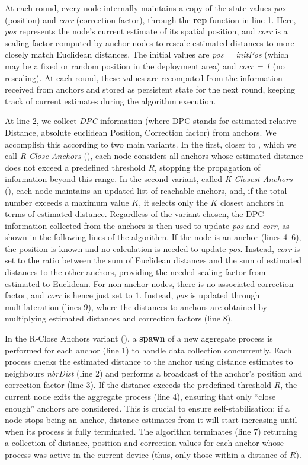 \documentclass[runningheads]{llncs}
\begin{document}
At each round, every node internally maintains a copy of the state values \emph{pos} (position) and \emph{corr} (correction factor), through  the \textbf{rep} function in line 1. Here, \emph{pos} represents the node's current estimate of its spatial position, and \emph{corr} is a scaling factor computed by anchor nodes to rescale estimated distances to more closely match Euclidean distances. The initial values are \emph{pos = initPos} (which may be a fixed or random position in the deployment area) and \emph{corr = 1} (no rescaling). At each round, these values are recomputed from the information received from anchors and stored as persistent state for the next round, keeping track of current estimates during the algorithm execution.

At line 2, we collect \emph{DPC} information (where DPC stands for estimated relative Distance, absolute euclidean Position, Correction factor) from anchors. We accomplish this according to two main variants. In the first, closer to \cite{DBLP:journals/telsys/NiculescuN03}, which we call \emph{R-Close Anchors} (), each node considers all anchors whose estimated distance does not exceed a predefined threshold $R$, stopping the propagation of information beyond this range. In the second variant, called \emph{K-Closest Anchors} (), each node maintains an updated list of reachable anchors, and, if the total number exceeds a maximum value $K$, it selects only the $K$ closest anchors in terms of estimated distance. Regardless of the variant chosen, the DPC information collected from the anchors is then used to update \emph{pos} and \emph{corr}, as shown in the following lines of the algorithm.
If the node is an anchor (lines 4–6), the position is known and no calculation is needed to update \emph{pos}. Instead, \emph{corr} is set to the ratio between the sum of Euclidean distances and the sum of estimated distances to the other anchors, providing the needed scaling factor from estimated to Euclidean. For non-anchor nodes, there is no associated correction factor, and  \emph{corr} is hence just set to $1$. Instead, \emph{pos} is updated through multilateration (lines 9), where the distances to anchors are obtained by multiplying estimated distances and correction factors (line 8).

In the R-Close Anchors variant (), a \textbf{spawn} of a new aggregate process is performed for each anchor (line 1) to handle data collection concurrently. Each process checks the estimated distance to the anchor using distance estimates to neighbours \emph{nbrDist} (line 2) and performs a broadcast of the anchor’s position and correction factor (line 3). If the distance exceeds the predefined threshold $R$, the current node exits the aggregate process (line 4), ensuring that only ``close enough'' anchors are considered. This is crucial to ensure self-stabilisation: if a node stops being an anchor, distance estimates from it will start increasing until when its process is fully terminated. The algorithm terminates (line 7) returning a collection of distance, position and correction values for each anchor whose process was active in the current device (thus, only those within a distance of $R$).
\end{document}
